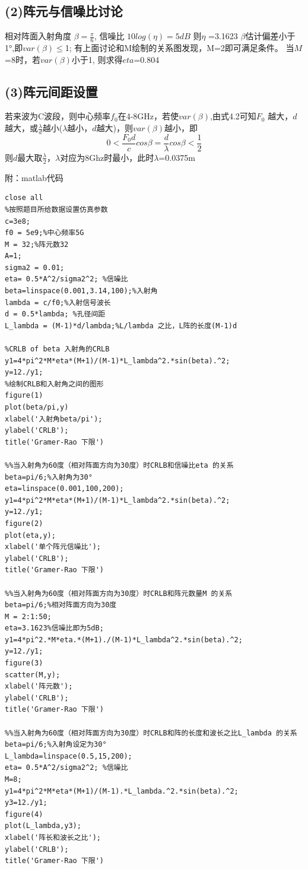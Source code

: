 \documentclass[fontset=windows]{article}
\numberwithin{figure}{section}
\begin{document}
\subsection*{(2)阵元与信噪比讨论}

相对阵面入射角度 $\beta=\frac{\pi}{6}$,
信噪比 $10log(\eta)=5dB$
则$\eta$ =3.1623
$\beta$估计偏差小于1°,即$var(\beta)\leq$1;
有上面讨论和M绘制的关系图发现，M=2即可满足条件。
当$M$=8时，若$var(\beta)$小于1,
则求得$eta$=0.804

\subsection*{(3)阵元间距设置}

若来波为C波段，则中心频率$f_0$在4-8GHz，若使$var(\beta)$,由式4.2可知$F_0$
越大，$d$越大，或$\frac{\lambda}{d}$越小($\lambda$越小，$d$越大)，则$var(\beta)$越小，即
$$0<\frac{F_0d}{c}cos\beta=\frac{d}{\lambda}cos\beta<\frac{1}{2}$$
则$d$最大取$\frac{\lambda}{2}$，$\lambda$对应为8Ghz时最小，此时$\lambda$=0.0375m

附：matlab代码
\begin{lstlisting}
close all
%按照题目所给数据设置仿真参数
c=3e8;
f0 = 5e9;%中心频率5G
M = 32;%阵元数32
A=1;
sigma2 = 0.01;
eta= 0.5*A^2/sigma2^2; %信噪比
beta=linspace(0.001,3.14,100);%入射角
lambda = c/f0;%入射信号波长
d = 0.5*lambda; %孔径间距
L_lambda = (M-1)*d/lambda;%L/lambda 之比，L阵的长度(M-1)d

%CRLB of beta 入射角的CRLB 
y1=4*pi^2*M*eta*(M+1)/(M-1)*L_lambda^2.*sin(beta).^2;
y=12./y1;
%绘制CRLB和入射角之间的图形
figure(1)
plot(beta/pi,y)
xlabel('入射角beta/pi');
ylabel('CRLB');
title('Gramer-Rao 下限')

%%当入射角为60度（相对阵面方向为30度）时CRLB和信噪比eta 的关系
beta=pi/6;%入射角为30°
eta=linspace(0.001,100,200);
y1=4*pi^2*M*eta*(M+1)/(M-1)*L_lambda^2.*sin(beta).^2;
y=12./y1;
figure(2)
plot(eta,y);
xlabel('单个阵元信噪比');
ylabel('CRLB');
title('Gramer-Rao 下限')

%%当入射角为60度（相对阵面方向为30度）时CRLB和阵元数量M 的关系
beta=pi/6;%相对阵面方向为30度
M = 2:1:50;
eta=3.1623%信噪比即为5dB;
y1=4*pi^2.*M*eta.*(M+1)./(M-1)*L_lambda^2.*sin(beta).^2;
y=12./y1;
figure(3)
scatter(M,y);
xlabel('阵元数');
ylabel('CRLB');
title('Gramer-Rao 下限')

%%当入射角为60度（相对阵面方向为30度）时CRLB和阵的长度和波长之比L_lambda 的关系
beta=pi/6;%入射角设定为30°
L_lambda=linspace(0.5,15,200);
eta= 0.5*A^2/sigma2^2; %信噪比
M=8;
y1=4*pi^2*M*eta*(M+1)/(M-1).*L_lambda.^2.*sin(beta).^2;
y3=12./y1;
figure(4)
plot(L_lambda,y3);
xlabel('阵长和波长之比');
ylabel('CRLB');
title('Gramer-Rao 下限')
\end{lstlisting}


\end{document}
